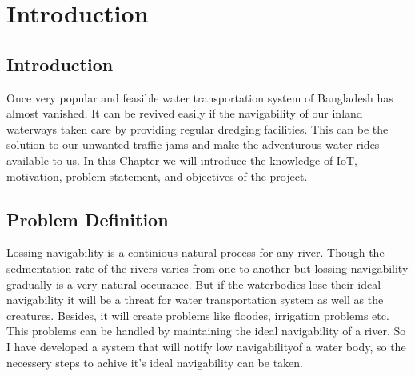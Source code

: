 \documentclass[12pt, top = 1 inch, bottom = 1 inch, left = 1.2 inch, top = .8 inch]{book}
\begin{document}
	\chapter{Introduction}
	\section{Introduction}
	Once very popular and feasible water transportation system of Bangladesh has almost vanished. It can be revived easily if the navigability of our inland waterways taken care by providing regular dredging facilities. This can be the solution to our unwanted traffic jams and make the adventurous water rides available to us. In this Chapter we will introduce the knowledge of IoT, motivation, problem statement, and objectives of the project.
	\section{Problem Definition}
	Lossing navigability is a continious natural process for any river. Though the sedmentation rate of the rivers varies from one to another but lossing navigability gradually is a very natural occurance. But if the waterbodies lose their ideal navigability it will be a threat for water transportation system as well as the creatures. Besides, it will create problems like floodes, irrigation problems etc. This problems can be handled by maintaining the ideal navigability of a river. So I have developed a system that will notify low navigabilityof a water body, so the necessery steps to achive it's ideal navigability can be taken.  
\end{document}

